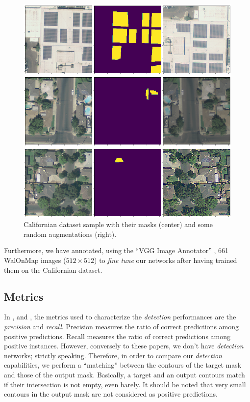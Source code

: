 \documentclass[twocolumn,superscriptaddress,aps,nofootinbib]{revtex4-1}
\begin{document}
\begin{figure}[h]
    \centering
    \includegraphics[width=\columnwidth]{resources/png/sample.png}
    \caption{Californian dataset sample with their masks (center) and some random augmentations (right).}
    \label{fig:augment_masks}
\end{figure}

Furthermore, we have annotated, using the \enquote{VGG Image Annotator} \cite{dutta2019vgg}, 661 WalOnMap images ($512 \times 512$) to \emph{fine tune} our networks after having trained them on the Californian dataset.

\subsection{Metrics}
\label{subsec:metrics}

In \cite{yu2018deepsolar}, \cite{malof2016automatic} and \cite{malof2016deep}, the metrics used to characterize the \emph{detection} performances are the \emph{precision} and \emph{recall}. Precision measures the ratio of correct predictions among positive predictions. Recall measures the ratio of correct predictions among positive instances. However, conversely to these papers, we don't have \emph{detection} networks; strictly speaking. Therefore, in order to compare our \emph{detection} capabilities, we perform a \enquote{matching} between the contours of the target mask and those of the output mask. Basically, a target and an output contours match if their intersection is not empty, even barely. It should be noted that very small contours in the output mask are not considered as positive predictions.
\end{document}
